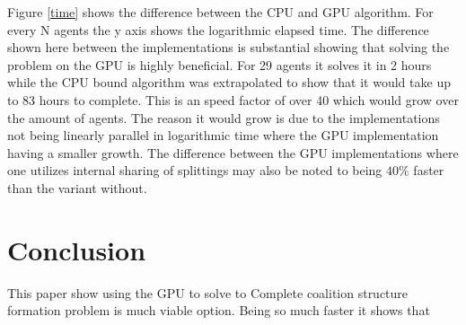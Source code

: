 \documentclass{llncs}
\begin{document}
Figure \ref{time} shows the difference between the CPU and GPU algorithm.
For every N agents the y axis shows the logarithmic elapsed time. The difference shown here between the implementations is substantial showing
that solving the problem on the GPU is highly beneficial. For 29 agents it solves it in 2 hours while the CPU bound algorithm was extrapolated to show that it would take up to 83 hours to complete. This is an speed factor of over 40 which would grow over the amount of agents. The reason it would grow is due to the implementations not being linearly parallel in logarithmic time where the GPU implementation having a smaller growth.
The difference between the GPU implementations where one utilizes internal 
sharing of splittings may also be noted to being $40\%$ faster than the variant without.
\section{Conclusion}
This paper show using the GPU to solve to Complete coalition structure formation problem is much viable option. Being so much faster it shows that

\end{document}
